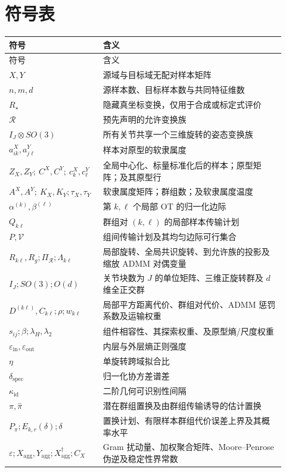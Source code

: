 \documentclass[10pt,a4paper,fontset=windows]{ctexart}
\theoremstyle{definition}
\theoremstyle{remark}
\begin{document}
\section{符号表}
\begin{longtable}{p{0.29\linewidth}p{0.63\linewidth}}
\toprule
符号 & 含义\\
\midrule
\endfirsthead
\toprule
符号 & 含义\\
\midrule
\endhead
$X,Y$ & 源域与目标域无配对样本矩阵\\
$n,m,d$ & 源样本数、目标样本数与共同特征维数\\
$R_\star$ & 隐藏真坐标变换，仅用于合成或标定式评价\\
$\mathcal R$ & 预先声明的允许变换族\\
$I_J\otimes SO(3)$ & 所有关节共享一个三维旋转的姿态变换族\\
$a_{ik}^X,a_{j\ell}^Y$ & 样本对原型的软隶属度\\
$Z_X,Z_Y;\ C^X,C^Y;\ c_k^X,c_\ell^Y$ & 全局中心化、标量标准化后的样本；原型矩阵；及其原型行\\
$A^X,A^Y;\ K_X,K_Y;\tau_X,\tau_Y$ & 软隶属度矩阵；群组数；及软隶属度温度\\
$\alpha^{(k)},\beta^{(\ell)}$ & 第 $k,\ell$ 个局部 OT 的归一化边际\\
$Q_{k\ell}$ & 群组对 $(k,\ell)$ 的局部样本传输计划\\
$P,\mathcal V$ & 组间传输计划及其均匀边际可行集合\\
$R_{k\ell},R_g;\Pi_{\mathcal R};\Lambda_{k\ell}$ & 局部旋转、全局共识旋转、到允许族的投影及缩放 ADMM 对偶变量\\
$I_J;SO(3);O(d)$ & 关节块数为 $J$ 的单位矩阵、三维正旋转群及 $d$ 维全正交群\\
$D^{(k\ell)},C_{k\ell};\rho;w_{k\ell}$ & 局部平方距离代价、群组对代价、ADMM 惩罚系数及运输权重\\
$s_{ij};\beta;\lambda_H,\lambda_2$ & 组件相容性、其探索权重、及原型熵/尺度权重\\
$\varepsilon_{\mathrm{in}},\varepsilon_{\mathrm{out}}$ & 内层与外层熵正则强度\\
$\eta$ & 单旋转跨域拟合比\\
$\delta_{\mathrm{spec}}$ & 归一化协方差谱差\\
$\kappa_{\mathrm{id}}$ & 二阶几何可识别性间隔\\
$\pi,\widehat\pi$ & 潜在群组置换及由群组传输诱导的估计置换\\
$P_\pi;E_{k,r}(\delta);\delta$ & 置换计划、有限样本群组代价误差上界及其概率水平\\
$\varepsilon;X_{\mathrm{agg}},Y_{\mathrm{agg}};X_{\mathrm{agg}}^\dagger;C_X$ & Gram 扰动量、加权聚合矩阵、Moore--Penrose 伪逆及稳定性界常数\\
\bottomrule
\end{longtable}


\begingroup
\small
\setlength{\parskip}{0pt}

\endgroup
\end{document}
